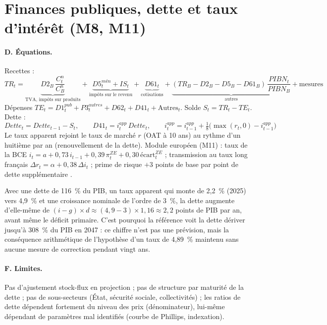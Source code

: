 \section{Finances publiques, dette et taux d'intérêt (M8, M11)}
\label{sec:finpub}

\paragraph{D. Équations.} Recettes :
\begin{equation}
TR_t = \underbrace{D2_B\,\frac{C^{n}_t}{C^{n}_B}}_{\text{TVA, impôts sur produits}} + \underbrace{D5^{mén}_t + IS_t}_{\text{impôts sur le revenu}} + \underbrace{D61_t}_{\text{cotisations}} + \underbrace{(TR_B - D2_B - D5_B - D61_B)\,\frac{PIBN_t}{PIBN_B}}_{\text{autres}} + \text{mesures}
\end{equation}
Dépenses $TE_t = D1^{pub}_t + P3^{autres}_t + D62_t + D41_t + \text{Autres}_t$. Solde $S_t = TR_t - TE_t$. Dette :
\begin{equation}
Dette_t = Dette_{t-1} - S_t,\qquad D41_t = i^{app}_t\,Dette_{t},\qquad i^{app}_t = i^{app}_{t-1} + \tfrac18\bigl(\max(r_t,0) - i^{app}_{t-1}\bigr)
\end{equation}
Le taux apparent rejoint le taux de marché $r$ (OAT à 10 ans) au rythme d'un huitième par an (renouvellement de la
dette). Module européen (M11) : taux de la BCE $i_t = a + 0{,}73\,i_{t-1} + 0{,}39\,\pi^{ZE}_t + 0{,}30\,\text{écart}^{ZE}_t$
 ; transmission au taux long français $\Delta r_t = \alpha + 0{,}38\,\Delta i_t$  ; prime de risque
$+3$ points de base par point de dette supplémentaire .

\begin{exemple}
Avec une dette de 116~\% du PIB, un taux apparent qui monte de 2,2~\% (2025) vers 4,9~\% et une croissance nominale de
l'ordre de 3~\%, la dette augmente d'elle-même de $(i-g)\times d \approx (4{,}9-3)\times1{,}16 \approx 2{,}2$ points de
PIB par an, avant même le déficit primaire. C'est pourquoi la référence voit la dette dériver jusqu'à 308~\% du PIB en
2047 : ce chiffre n'est pas une prévision, mais la conséquence arithmétique de l'hypothèse d'un taux de 4,89~\% maintenu
sans aucune mesure de correction pendant vingt ans.
\end{exemple}

\paragraph{F. Limites.} Pas d'ajustement stock-flux en projection ; pas de structure par maturité de la dette ; pas de
sous-secteurs (État, sécurité sociale, collectivités) ; les ratios de dette dépendent fortement du niveau des prix
(dénominateur), lui-même dépendant de paramètres mal identifiés (courbe de Phillips, indexation).

